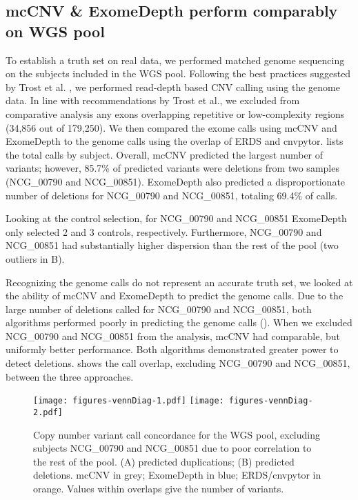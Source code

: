 \documentclass{article}\usepackage[]{graphicx}\usepackage[]{color}
\begin{document}
\subsection{mcCNV \& ExomeDepth perform comparably on WGS pool}

To establish a truth set on real data, we performed matched genome sequencing on the subjects included in the WGS pool.
Following the best practices suggested by Trost et al. \cite{trost:2018aa}, we performed read-depth based CNV calling using the genome data.
In line with recommendations by Trost et al., we excluded from comparative  analysis any exons overlapping repetitive or low-complexity regions (34,856 out of 179,250).
We then compared the exome calls using mcCNV and ExomeDepth to the genome calls using the overlap of ERDS and cnvpytor.
 lists the total calls by subject.
Overall, mcCNV predicted the largest number of variants; however, 85.7\% of predicted variants were deletions from two samples (NCG\_00790 and NCG\_00851).
ExomeDepth also predicted a disproportionate number of deletions for NCG\_00790 and NCG\_00851, totaling 69.4\% of calls.



Looking at the control selection, for NCG\_00790 and NCG\_00851 ExomeDepth only selected 2 and 3 controls, respectively.
Furthermore, NCG\_00790 and NCG\_00851 had substantially higher dispersion than the rest of the pool (two outliers in B).

Recognizing the genome calls do not represent an accurate truth set, we looked at the ability of mcCNV and ExomeDepth to predict the genome calls.
Due to the large number of deletions called for NCG\_00790 and NCG\_00851, both algorithms performed poorly in predicting the genome calls ().
When we excluded NCG\_00790 and NCG\_00851 from the analysis, mcCNV had comparable, but uniformly better performance.
Both algorithms demonstrated greater power to detect deletions.
 shows the call overlap, excluding NCG\_00790 and NCG\_00851, between the three approaches.



\begin{figure}
  \centering
  \texttt{[image: figures-vennDiag-1.pdf]}%
  \texttt{[image: figures-vennDiag-2.pdf]}
  \caption{Copy number variant call concordance for the WGS pool, excluding subjects NCG\_00790 and NCG\_00851 due to poor correlation to the rest of the pool. (A) predicted duplications; (B) predicted deletions. mcCNV in grey; ExomeDepth in blue; ERDS/cnvpytor in orange. Values within overlaps give the number of variants.}
  \label{fig:wgsVenn}
\end{figure}
\end{document}
